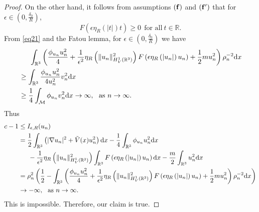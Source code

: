\documentclass[10pt,a4paper]{amsart}
\begin{document}
\begin{proof}
On the other hand, it follows from assumptions $({\bf f})$ and $({\bf f'})$ that for $\epsilon\in (0,\frac{\delta_0}{R})$,
\begin{equation}\label{eq21}
   F\left (\epsilon \eta _{R} \left ( \left | t\right |\right )t\right )\geq 0\ ~\text{for all}~t\in\mathbb{R}.
\end{equation}
From \eqref{eq21} and the Fatou lemma, for $\epsilon\in (0,\frac{\delta_0}{R})$ we have
\begin{equation*}
	\begin{split}
&\indent\int_{\mathbb{R}^3}\left(\frac{\phi_{u_n}u^{2}_{n}}{4}+\frac{1}{\epsilon^2}\eta _{R}\left (\|u_n\|^{2}_{H^1_{V}(\mathbb{R}^3)}\right )F\left (\epsilon \eta _{R} \left ( \left | u_n\right |\right )u_n\right )+\frac{1}{2}mu_{n}^{2}\right)\rho^{-2}_n\text{d}x\\
&\geq\int_{\mathbb{R}^3}\frac{\phi_{u_n}u^{2}_{n}}{4u_{n}^{2}}v^{2}_{n}\text{d}x\\
&\geq \frac{1}{4}\int_{\mathcal{M}}\phi_{u_n}v^{2}_n\text{d}x\to\infty,~~\text{as}~n\to\infty.
\end{split}
\end{equation*}
Thus
\begin{equation*}
		\begin{split}
		c-1&\leq I_{\epsilon,R}(u_n)\\
		&=\frac{1}{2}\int_{\mathbb{R}^3}\left(|\nabla u_n|^{2}+\tilde V(x)u_n^{2}\right)\text{d}x-\frac{1}{4}\int_{\mathbb{R}^3}\phi_{u_n}u_n^{2}\text{d}x\\
		&\indent-\frac{1}{\epsilon^{2}}\eta _{R}\left (\|u_n\|^{2}_{H^1_{V}(\mathbb{R}^3)}\right )\int_{\mathbb{R}^3}F\left (\epsilon \eta _{R} \left ( \left | u_n\right |\right )u_n\right )\text{d}x-\frac{m}{2}\int_{\mathbb{R}^3}u_n^{2}\text{d}x\\
		&=\rho_{n}^{2}\left(\frac{1}{2}-\int_{\mathbb{R}^3}\left(\frac{\phi_{u_n}u^{2}_{n}}{4}+\frac{1}{\epsilon^2}\eta _{R}\left (\|u_n\|^{2}_{H^1_{V}(\mathbb{R}^3)}\right )F\left (\epsilon \eta _{R} \left ( \left | u_n\right |\right )u_n\right )+\frac{1}{2}mu_{n}^{2}\right)\rho^{-2}_n\text{d}x\right)\\
        &\to-\infty,~~\text{as}~n\to\infty.
	\end{split}
    \end{equation*}
This is impossible. Therefore, our claim is true.


\end{proof}
\end{document}
